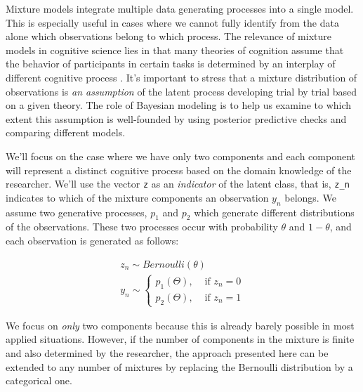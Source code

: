 \documentclass[12pt,]{krantz}
\theoremstyle{definition}
\theoremstyle{definition}
\theoremstyle{definition}
\theoremstyle{remark}
\begin{document}
Mixture models integrate multiple data generating processes into a single model. This is especially useful in cases where we cannot fully identify from the data alone which observations belong to which process.
The relevance of mixture models in cognitive science lies in that many theories of cognition assume that the behavior of participants in certain tasks is determined by an interplay of different cognitive process \citetext{\citealp[e.g., reaction times in schizophrenia in][]{levy1993eye}; \citealp[retrieval from memory in sentence processing in][]{Mcelree2000}; \citealp{nicenboimModelsRetrievalSentence2018}; \citealp[fast choices in][]{Ollman1966}; \citealp{DutilhEtAl2011}}. It's important to stress that a mixture distribution of observations is \emph{an assumption} of the latent process developing trial by trial based on a given theory. The role of Bayesian modeling is to help us examine to which extent this assumption is well-founded by using posterior predictive checks and comparing different models.

We'll focus on the case where we have only two components and each component will represent a distinct cognitive process based on the domain knowledge of the researcher. We'll use the vector \texttt{z} as an \emph{indicator} of the latent class, that is, \texttt{z\_n} indicates to which of the mixture components an observation \(y_n\) belongs. We assume two generative processes, \(p_1\) and \(p_2\) which generate different distributions of the observations. These two processes occur with probability \(\theta\) and \(1-\theta\), and each observation is generated as follows:

\begin{equation}
\begin{aligned}
z_n \sim Bernoulli(\theta)\\
y_n \sim 
\begin{cases}
p_1(\Theta), & \text{ if } z_n =0 \\
p_2(\Theta), & \text{ if } z_n=1
\end{cases}
\end{aligned}
\end{equation}

We focus on \emph{only} two components because this is already barely possible in most applied situations. However, if
the number of components in the mixture is finite and also determined by the researcher, the approach presented here can be extended to any number of mixtures by replacing the Bernoulli distribution by a categorical one.
\end{document}
